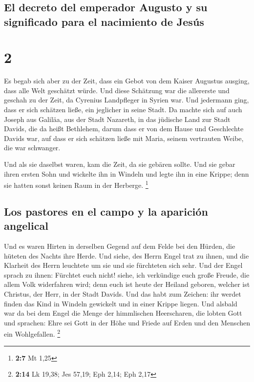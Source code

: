 \hypertarget{el-decreto-del-emperador-augusto-y-su-significado-para-el-nacimiento-de-jesuxfas}{%
\subsection{El decreto del emperador Augusto y su significado para el
nacimiento de
Jesús}\label{el-decreto-del-emperador-augusto-y-su-significado-para-el-nacimiento-de-jesuxfas}}

\hypertarget{section-1}{%
\section{2}\label{section-1}}

 Es begab sich aber zu der Zeit, dass ein Gebot von dem
Kaiser Augustus ausging, dass alle Welt geschätzt würde. 
Und diese Schätzung war die allererste und geschah zu der Zeit, da
Cyrenius Landpfleger in Syrien war.  Und jedermann ging,
dass er sich schätzen ließe, ein jeglicher in seine Stadt.
 Da machte sich auf auch Joseph aus Galiläa, aus der Stadt
Nazareth, in das jüdische Land zur Stadt Davids, die da heißt Bethlehem,
darum dass er von dem Hause und Geschlechte Davids war, 
auf dass er sich schätzen ließe mit Maria, seinem vertrauten Weibe, die
war schwanger.

 Und als sie daselbst waren, kam die Zeit, da sie gebären
sollte.  Und sie gebar ihren ersten Sohn und wickelte ihn
in Windeln und legte ihn in eine Krippe; denn sie hatten sonst keinen
Raum in der Herberge. \footnote{\textbf{2:7} Mt 1,25}

\hypertarget{los-pastores-en-el-campo-y-la-apariciuxf3n-angelical}{%
\subsection{Los pastores en el campo y la aparición
angelical}\label{los-pastores-en-el-campo-y-la-apariciuxf3n-angelical}}

 Und es waren Hirten in derselben Gegend auf dem Felde bei
den Hürden, die hüteten des Nachts ihre Herde.  Und siehe,
des Herrn Engel trat zu ihnen, und die Klarheit des Herrn leuchtete um
sie und sie fürchteten sich sehr.  Und der Engel sprach
zu ihnen: Fürchtet euch nicht! siehe, ich verkündige euch große Freude,
die allem Volk widerfahren wird;  denn euch ist heute der
Heiland geboren, welcher ist Christus, der Herr, in der Stadt Davids.
 Und das habt zum Zeichen: ihr werdet finden das Kind in
Windeln gewickelt und in einer Krippe liegen.  Und
alsbald war da bei dem Engel die Menge der himmlischen Heerscharen, die
lobten Gott und sprachen:  Ehre sei Gott in der Höhe und
Friede auf Erden und den Menschen ein Wohlgefallen. \footnote{\textbf{2:14}
  Lk 19,38; Jes 57,19; Eph 2,14; Eph 2,17}

